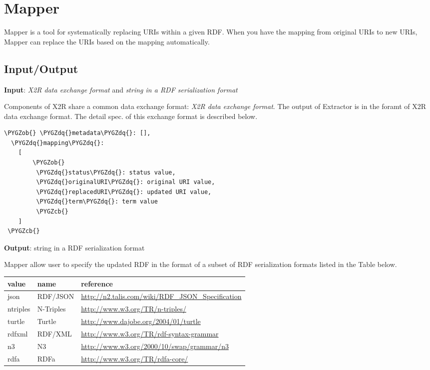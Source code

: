 \documentclass[letterpaper,10pt,english]{sphinxmanual}
\def\PYGZob{\char`\{}
\def\PYGZcb{\char`\}}
\def\PYGZdq{\char`\"}
\begin{document}
\section{Mapper}
\label{docs/mapper:mapper}\label{docs/mapper::doc}\label{docs/mapper:id1}
Mapper is a tool for systematically replacing URIs within a given RDF. When you have the mapping from original URIs to new URIs, Mapper can replace the URIs based on the mapping automatically.


\subsection{Input/Output}
\label{docs/mapper:input-output}
\textbf{Input}: \emph{X2R data exchange format} and \emph{string in a RDF serialization format}

Components of X2R share a common data exchange format: \emph{X2R data exchange format}. The output of Extractor is in the foramt of X2R data exchange format. The detail spec. of this exchange format is described below.

\begin{Verbatim}[commandchars=\\\{\}]
\PYGZob{} \PYGZdq{}metadata\PYGZdq{}: [],
  \PYGZdq{}mapping\PYGZdq{}:
    [
        \PYGZob{}
         \PYGZdq{}status\PYGZdq{}: status value,
         \PYGZdq{}originalURI\PYGZdq{}: original URI value,
         \PYGZdq{}replacedURI\PYGZdq{}: updated URI value,
         \PYGZdq{}term\PYGZdq{}: term value
         \PYGZcb{}
    ]
 \PYGZcb{}
\end{Verbatim}

\textbf{Output}: string in a RDF serialization format

Mapper allow user to specify the updated RDF in the format of a subset of RDF serialization formats listed in the Table below.

\begin{tabulary}{\linewidth}{|L|L|L|}
\hline
\textsf{\relax 
value
} & \textsf{\relax 
name
} & \textsf{\relax 
reference
}\\
\hline
json
 & 
RDF/JSON
 & 
\href{http://n2.talis.com/wiki/RDF\_JSON\_Specification}{http://n2.talis.com/wiki/RDF\_JSON\_Specification}
\\

ntriples
 & 
N-Triples
 & 
\href{http://www.w3.org/TR/n-triples/}{http://www.w3.org/TR/n-triples/}
\\

turtle
 & 
Turtle
 & 
\href{http://www.dajobe.org/2004/01/turtle}{http://www.dajobe.org/2004/01/turtle}
\\

rdfxml
 & 
RDF/XML
 & 
\href{http://www.w3.org/TR/rdf-syntax-grammar}{http://www.w3.org/TR/rdf-syntax-grammar}
\\

n3
 & 
N3
 & 
\href{http://www.w3.org/2000/10/swap/grammar/n3}{http://www.w3.org/2000/10/swap/grammar/n3}
\\

rdfa
 & 
RDFa
 & 
\href{http://www.w3.org/TR/rdfa-core/}{http://www.w3.org/TR/rdfa-core/}
\\
\hline\end{tabulary}
\end{document}
